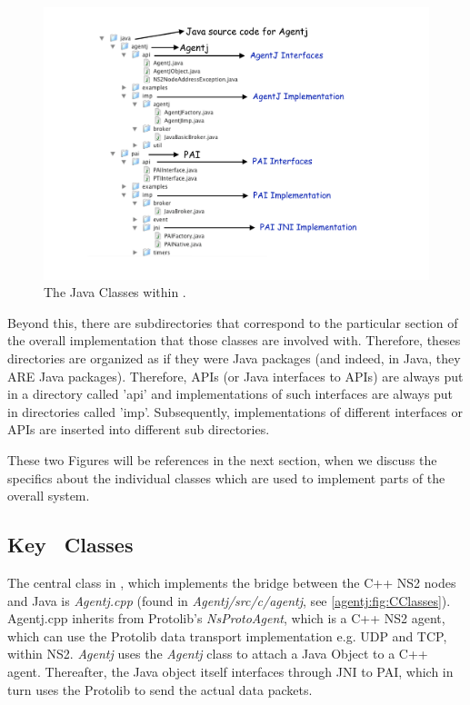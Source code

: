 \begin{figure}
\centering
\includegraphics[scale=0.45]{images/agentjJavaClasses}
\caption{The Java Classes within \agentj.} 
\label{agentj:fig:JavaClasses}
\end{figure}


Beyond this, there are subdirectories that correspond to the
particular section of the overall implementation that those
classes are involved with. Therefore, theses directories are
organized as if they were Java packages (and indeed, in Java,
they ARE Java packages). Therefore, APIs (or Java interfaces 
to APIs) are always put in a directory called 'api' and 
implementations of such interfaces are always put in  
directories called 'imp'. Subsequently, implementations of different 
interfaces or APIs are inserted into different sub directories. 

These two Figures will be references in the next section, when we
discuss the specifics about the individual classes which are used
to implement parts of the overall system.
 
\subsection{Key \agentj~Classes}

The central class in \agentj, which implements the bridge between the 
C++ NS2  nodes and Java is \emph{Agentj.cpp} (found in  
\emph{Agentj/src/c/agentj}, see \ref{agentj:fig:CClasses}).  Agentj.cpp
inherits from Protolib's \emph{NsProtoAgent}, which
is a C++ NS2 agent, which can use the Protolib data transport 
implementation e.g. UDP and TCP, within NS2. \emph{Agentj} uses 
the \emph{Agentj} class to attach a Java Object to a C++ agent.  
Thereafter, the Java object itself interfaces through JNI to PAI, 
which in turn uses the Protolib to send the actual data packets. 

